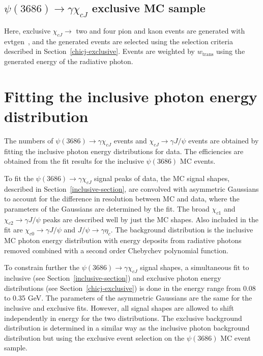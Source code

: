 \documentclass[aps,prd,twocolumn,showpacs,floatfix,byrevtex]{revtex4-1}
\begin{document}
 \subsection{\boldmath $\psi(3686) \to \gamma \chi_{cJ}$ exclusive MC
   sample}
\label{exclusiveMC}
Here, exclusive $\chi_{cJ} \to$ two and four pion and kaon events are
generated with {\sc evtgen}~\cite{evtgen}, and the generated events
are selected using the selection criteria described in
Section~\ref{chicj-exclusive}. Events are weighted by $w_{\text{trans}}$
using the generated energy of the radiative photon.

\section{Fitting the inclusive photon energy distribution}
\label{fitting}

The numbers of $\psi(3686) \to \gamma \chi_{cJ}$ events and $\chi_{cJ}
\to \gamma J/\psi$ events are obtained by fitting the inclusive photon
energy distributions for data.  The efficiencies are obtained from the
fit results for the inclusive $\psi(3686)$ MC events. %

To fit the $\psi(3686) \to \gamma \chi_{cJ}$ signal peaks of
data, the MC signal shapes, described in Section~\ref{inclusive-section},
are convolved with asymmetric Gaussians to account for the difference
in resolution between MC and data, where the parameters of the
Gaussians are determined by the fit.
The broad $\chi_{c1}$ and $\chi_{c2} \to \gamma J/\psi$ peaks are
described well by just the MC shapes.
Also included in the fit are $\chi_{c0} \to \gamma J/\psi$ and $J/\psi
\to \gamma \eta_c$.  The background distribution is the inclusive MC
photon energy distribution with energy deposits from radiative photons
removed combined with a second order Chebychev polynomial function.

To constrain further the $\psi(3686) \to \gamma \chi_{cJ}$ signal
shapes, a simultaneous fit to inclusive (see
Section~\ref{inclusive-section}) and exclusive photon energy
distributions (see Section~\ref{chicj-exclusive}) is done in the
energy range from 0.08 to 0.35 GeV. The parameters of the asymmetric
Gaussians are the same for the inclusive and exclusive fits.  However,
all signal shapes are allowed to shift independently in energy for the two
distributions.  The exclusive background distribution is determined in
a similar way as the inclusive photon background distribution but
using the exclusive event selection on the $\psi(3686)$ MC event
sample.
\end{document}

